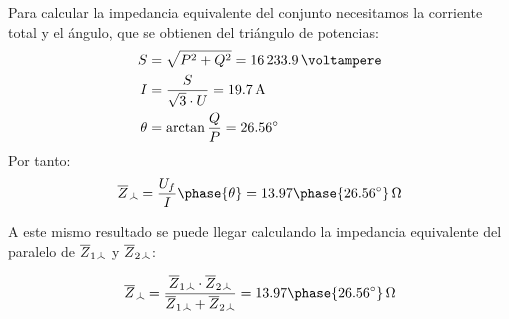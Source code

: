 \begin{enumerate}
  Para calcular la impedancia equivalente del conjunto necesitamos la corriente total y el ángulo, que se obtienen del triángulo de potencias:
  \begin{align*}
    S &= \sqrt{P^2 + Q^2} = \qty{16233.9}{\voltampere}\\
    I &= \frac{S}{\sqrt{3} \cdot U} = \qty{19.7}{\ampere}\\
    \theta &= \arctan{\frac{Q}{P}} = \ang{26.56}
  \end{align*}
  Por tanto:
  \[
    \overline{Z}_{\wye} = \frac{U_f}{I}\phase{\theta} = 13.97\phase{\ang{26.56}}\,\unit{\ohm}
  \]

  A este mismo resultado se puede llegar calculando la impedancia equivalente del paralelo de $\overline{Z}_{1\wye}$ y $\overline{Z}_{2\wye}$:

  \[
    \overline{Z}_{\wye} = \frac{\overline{Z}_{1\wye} \cdot \overline{Z}_{2\wye}}{\overline{Z}_{1\wye} + \overline{Z}_{2\wye}} = 13.97\phase{\ang{26.56}}\,\unit{\ohm}
  \]
\end{enumerate}

